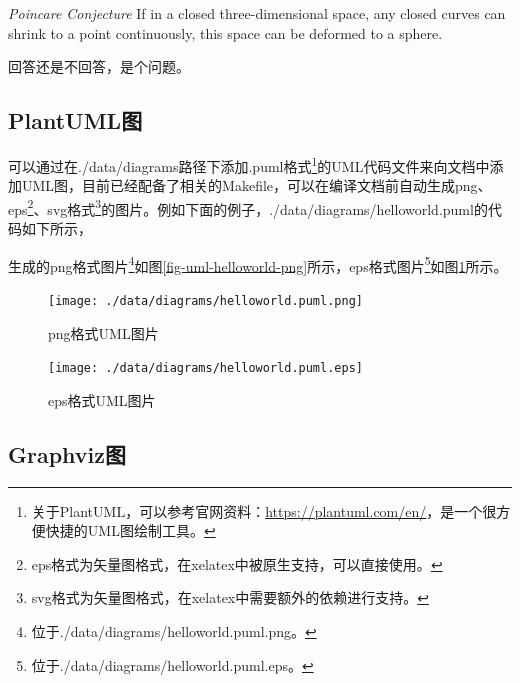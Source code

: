 \begin{conjecture}
    \label{thm-conjecture-example}
    \textit{Poincare Conjecture} If in a closed three-dimensional space,
    any closed curves can shrink to a point continuously,
    this space can be deformed to a sphere.
\end{conjecture}

\begin{problem}
    \label{thm-problem-example}
    回答还是不回答，是个问题。
\end{problem}


\subsection{PlantUML图}

可以通过在./data/diagrams路径下添加.puml格式\footnote{关于PlantUML，可以参考官网资料：\url{https://plantuml.com/en/}，是一个很方便快捷的UML图绘制工具。}的UML代码文件来向文档中添加UML图，目前已经配备了相关的Makefile，可以在编译文档前自动生成png、eps\footnote{eps格式为矢量图格式，在xelatex中被原生支持，可以直接使用。}、svg格式\footnote{svg格式为矢量图格式，在xelatex中需要额外的依赖进行支持。}的图片。例如下面的例子，./data/diagrams/helloworld.puml的代码如下所示，

生成的png格式图片\footnote{位于./data/diagrams/helloworld.puml.png。}如图\ref{fig-uml-helloworld-png}所示，eps格式图片\footnote{位于./data/diagrams/helloworld.puml.eps。}如图\ref{fig-uml-helloworld-eps}所示。
\begin{figure}[h!]
	\begin{minipage}{0.48\textwidth}
		\centering
		\texttt{[image: ./data/diagrams/helloworld.puml.png]}
		\caption{png格式UML图片}
		\label{fig-uml-helloworld-png}
	\end{minipage}
	\begin{minipage}{0.48\textwidth}
		\centering
		\texttt{[image: ./data/diagrams/helloworld.puml.eps]}
		\caption{eps格式UML图片}
		\label{fig-uml-helloworld-eps}
	\end{minipage}
\end{figure}


\subsection{Graphviz图}

